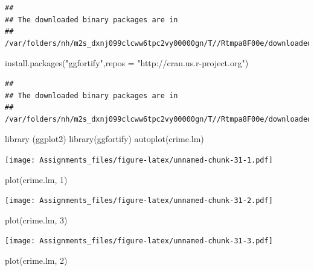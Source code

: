 \documentclass[
]{article}
\newenvironment{Shaded}{\begin{snugshade}}{\end{snugshade}}
\newcommand{\AttributeTok}[1]{\textcolor[rgb]{0.77,0.63,0.00}{#1}}
\newcommand{\DecValTok}[1]{\textcolor[rgb]{0.00,0.00,0.81}{#1}}
\newcommand{\FunctionTok}[1]{\textcolor[rgb]{0.00,0.00,0.00}{#1}}
\newcommand{\NormalTok}[1]{#1}
\newcommand{\StringTok}[1]{\textcolor[rgb]{0.31,0.60,0.02}{#1}}
\begin{document}
\begin{verbatim}
## 
## The downloaded binary packages are in
##  /var/folders/nh/m2s_dxnj099clcww6tpc2vy00000gn/T//Rtmpa8F00e/downloaded_packages
\end{verbatim}

\begin{Shaded}
\begin{Highlighting}[]
\FunctionTok{install.packages}\NormalTok{(}\StringTok{"ggfortify"}\NormalTok{,}\AttributeTok{repos =} \StringTok{"http://cran.us.r{-}project.org"}\NormalTok{)}
\end{Highlighting}
\end{Shaded}

\begin{verbatim}
## 
## The downloaded binary packages are in
##  /var/folders/nh/m2s_dxnj099clcww6tpc2vy00000gn/T//Rtmpa8F00e/downloaded_packages
\end{verbatim}

\begin{Shaded}
\begin{Highlighting}[]
\FunctionTok{library}\NormalTok{ (ggplot2)}
\FunctionTok{library}\NormalTok{(ggfortify)}
\FunctionTok{autoplot}\NormalTok{(crime.lm)}
\end{Highlighting}
\end{Shaded}

\texttt{[image: Assignments\_files/figure-latex/unnamed-chunk-31-1.pdf]}

\begin{Shaded}
\begin{Highlighting}[]
\FunctionTok{plot}\NormalTok{(crime.lm, }\DecValTok{1}\NormalTok{)}
\end{Highlighting}
\end{Shaded}

\texttt{[image: Assignments\_files/figure-latex/unnamed-chunk-31-2.pdf]}

\begin{Shaded}
\begin{Highlighting}[]
\FunctionTok{plot}\NormalTok{(crime.lm, }\DecValTok{3}\NormalTok{)}
\end{Highlighting}
\end{Shaded}

\texttt{[image: Assignments\_files/figure-latex/unnamed-chunk-31-3.pdf]}

\begin{Shaded}
\begin{Highlighting}[]
\FunctionTok{plot}\NormalTok{(crime.lm, }\DecValTok{2}\NormalTok{)}
\end{Highlighting}
\end{Shaded}
\end{document}
